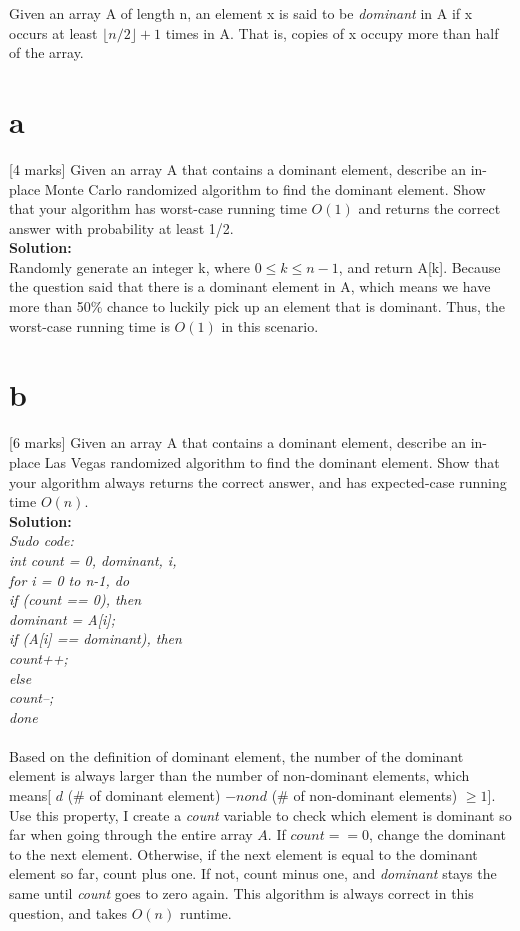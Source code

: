 \documentclass[12pt]{article}
\begin{document}
Given an array A of length n, an element x is said to be \emph{dominant}
in A if x occurs at least $\lfloor n/2 \rfloor + 1$ times in A.
That is, copies of x occupy more than half of the array.
\begin{itemize}
\part{a} [4 marks] Given an array A that contains a dominant element,
describe an in-place Monte Carlo randomized algorithm to find the dominant
element. Show that your algorithm has worst-case running time $O(1)$
and returns the correct answer with probability at least 1/2.
\\\textbf{Solution:}
\\Randomly generate an integer k, where $0 \leq k \leq n-1$, and return A[k]. Because the question said that there is a dominant element in A, which means we have more than 50\% chance to luckily pick up an element that is dominant. Thus, the worst-case running time is $O(1)$ in this scenario. 
\part{b} [6 marks] Given an array A that contains a dominant element,
describe an in-place Las Vegas randomized algorithm to find the dominant
element. Show that your algorithm always returns the correct answer,
and has expected-case running time $O(n)$.
\\\textbf{Solution:}
\\\textit{Sudo code:}
\\\textit{int count = 0, dominant, i,
\\for i = 0 to n-1, do
\\if (count == 0), then
\\dominant = A[i];
\\if (A[i] == dominant), then
\\count++;
\\else
\\count--;
\\done
}
\\
\\Based on the definition of dominant element, the number of the dominant element is always larger than the number of non-dominant elements, which means[ $d$ (\# of dominant element) $- nond$ (\# of non-dominant elements) $\geq 1$]. Use this property, I create a \textit{count} variable to check which element is dominant so far when going through the entire array $A$. If $count == 0$, change the dominant to the next element. Otherwise, if the next element is equal to the dominant element so far, count plus one. If not, count minus one, and \textit{dominant} stays the same until \textit{count} goes to zero again. This algorithm is always correct in this question, and takes $O(n)$ runtime. 
\end{itemize}
\end{document}
